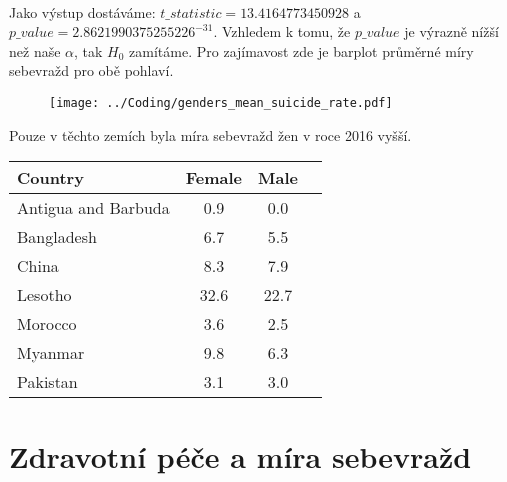 \documentclass[12pt]{article}
\begin{document}
\paragraph{}
Jako výstup dostáváme: $t\_statistic = 13.4164773450928$ a $p\_value = 2.8621990375255226^{-31}$. Vzhledem k tomu, že $p\_value$ je výrazně nížší než naše $\alpha$, tak $H_0$ zamítáme. Pro zajímavost zde je barplot průměrné míry sebevražd pro obě pohlaví. 
\begin{figure}[hbt]
  \centering
  \texttt{[image: ../Coding/genders\_mean\_suicide\_rate.pdf]}
  \label{fig:plot}
\end{figure}

\newpage
Pouze v těchto zemích byla míra sebevražd žen v roce 2016 vyšší.
\begin{table}[htb]
\centering
\label{tab:suicide-rates}
\begin{tabular}{lccc}
\hline
Country & Female & Male \\
\hline
Antigua and Barbuda & 0.9 & 0.0 \\
Bangladesh & 6.7 & 5.5 \\
China & 8.3 & 7.9 \\
Lesotho & 32.6 & 22.7 \\
Morocco & 3.6 & 2.5 \\
Myanmar & 9.8 & 6.3 \\
Pakistan & 3.1 & 3.0 \\
\hline
\end{tabular}
\end{table}

\section{Zdravotní péče a míra sebevražd}



\end{document}

